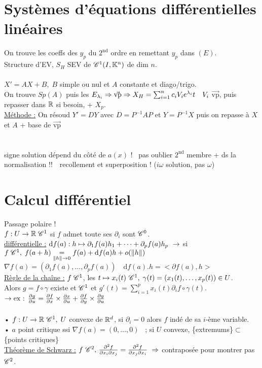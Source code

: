 \documentclass[12 pt]{exampleclass}
\begin{document}
\section{Systèmes d'équations différentielles linéaires}
On trouve les coeffs des $y_p$ du $2^\text{nd}$ ordre en remettant $y_p$ dans $(E)$.\\
Structure d'EV, $S_H$ SEV de $\mathscr{C}^1(I,\mathbb{K}^n)$ de dim $n$.\\
\text{}\\
$X' =AX+B, \; B$ simple ou nul et $A$ constante et diago/trigo.\\
On trouve $Sp(A)$ puis les $E_{\lambda_i} \Rightarrow \Vec{\text{vp}} \Rightarrow X_H = \sum_{i=1}^n c_i V_i e^{\lambda_i}t \quad V_i$ $\Vec{\text{vp}}$, puis repasser dans $\mathbb{R}$ si besoin, + $X_p$.\\
\underline{Méthode :} On résoud $Y' = DY$ avec $D=P^{-1}AP$ et $Y=P^{-1}X$ puis on repasse à $X$ et $A$ + base de $\Vec{\text{vp}}$\\
\text{}\\
\text{}\\
signe solution dépend du côté de $a(x)$ ! \ pas oublier $2^\text{nd}$ membre + ds la normalisation !!\ \ recollement et superposition ! \qquad ($i\omega$ solution, pas $\omega$)\\

\section{Calcul différentiel}
Passage polaire !\\
$f : U\to \mathbb{R} \; \mathscr{C}^1$ si $f$ admet toute ses $\partial_i$ sont $\mathscr{C}^0$.\\
\underline{différentielle :} $\text{d}f(a) : h\mapsto \partial_1f(a) h_1 +\dots + \partial_p f(a) h_p \ \rightarrow$ si $f \; \mathscr{C}^1, \; f(a+h) \underset{\|h\|\to0}{=} f(a)+\text{d}f(a) h +o(\|h\|)$\\
$\nabla f(a) = (\partial_1 f(a),\dots, \partial_p f(a)) \quad \text{d}f(a).h = <\partial f(a),h>$\\
\underline{Règle de la chaîne :} $f \; \mathscr{C}^1$, les $t\mapsto x_i(t)\ \mathscr{C}^1, \; \gamma(t) = (x_1(t),\dots,x_p(t))\in U$.\\
Alors $g=f\circ \gamma$ existe et $\mathscr{C}^1$ et $g'(t) = \sum_{i=1}^p x_i(t) \partial_if\circ \gamma(t)$.\\
$\rightarrow \text{ex : }\frac{\partial g}{\partial u} = \frac{\partial f}{\partial x}\times \frac{\partial x}{\partial u} + \frac{\partial f}{\partial y}\times \frac{\partial y}{\partial u}$\\
\text{}\\
• $f : U\to \mathbb{R} \ \mathscr{C}^1, \; U$ convexe de $\mathbb{R}^d$, si $\partial_i=0$ alors $f$ indé de sa $i$-ème variable.\\
• $a$ point critique ssi $\nabla f(a) =(0,\dots,0)$ \ ; si $U$ convexe, \{extremums\}$\subset$\{points critiques\}\\
\underline{Théorème de Schwarz :} $f \ \mathscr{C}^2, \, \frac{\partial^2 f}{\partial x_i \partial x_j} = \frac{\partial^2 f}{\partial x_j\partial x_i} \ \Rightarrow$ contraposée pour montrer pas $\mathscr{C}^2$.\\
\end{document}
